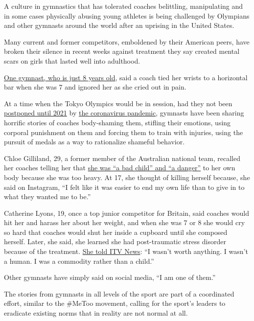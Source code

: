 A culture in gymnastics that has tolerated coaches belittling,
manipulating and in some cases physically abusing young athletes is
being challenged by Olympians and other gymnasts around the world after
an uprising in the United States.

Many current and former competitors, emboldened by their American peers,
have broken their silence in recent weeks against treatment they say
created mental scars on girls that lasted well into adulthood.

\href{https://www.itv.com/news/2020-07-07/girl-8-describes-bullying-by-gymnastics-coaches-as-review-is-pledged}{One
gymnast, who is just 8 years old}, said a coach tied her wrists to a
horizontal bar when she was 7 and ignored her as she cried out in pain.

At a time when the Tokyo Olympics would be in session, had they not been
\href{https://www.nytimes3xbfgragh.onion/2020/03/24/sports/olympics/coronavirus-summer-olympics-postponed.html}{postponed
until 2021} by
\href{https://www.nytimes3xbfgragh.onion/news-event/coronavirus}{the
coronavirus pandemic}, gymnasts have been sharing horrific stories of
coaches body-shaming them, stifling their emotions, using corporal
punishment on them and forcing them to train with injuries, using the
pursuit of medals as a way to rationalize shameful behavior.

Chloe Gilliland, 29, a former member of the Australian national team,
recalled her coaches telling her that
\href{https://7news.com.au/sport/gymnastics/how-fat-shaming-drove-aussie-gymnast-to-breaking-point-c-1186590}{she
was ``a bad child'' and ``a danger''} to her own body because she was
too heavy. At 17, she thought of killing herself because, she said on
Instagram, ``I felt like it was easier to end my own life than to give
in to what they wanted me to be.''

Catherine Lyons, 19, once a top junior competitor for Britain, said
coaches would hit her and harass her about her weight, and when she was
7 or 8 she would cry so hard that coaches would shut her inside a
cupboard until she composed herself. Later, she said, she learned she
had post-traumatic stress disorder because of the treatment.
\href{https://www.itv.com/news/2020-07-22/truth-gives-power-to-abused-gymnasts}{She
told ITV News}: ``I wasn't worth anything. I wasn't a human. I was a
commodity rather than a child.''

Other gymnasts have simply said on social media, ``I am one of them.''

The stories from gymnasts in all levels of the sport are part of a
coordinated effort, similar to the \#MeToo movement, calling for the
sport's leaders to eradicate existing norms that in reality are not
normal at all.

